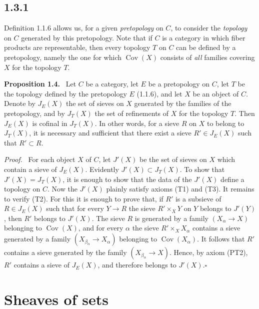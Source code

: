 \documentclass[11pt]{article}
\newcommand{\Cov}{\operatorname{Cov}}
\newcommand{\qedtext}{\hfill\(\square\)}
\newenvironment{statement}[1]{\par\medskip\noindent\textbf{#1.}\ }{\par\medskip}
\newenvironment{prooftext}{\par\noindent\emph{Proof.}\ }{\par\medskip}
\begin{document}
\subsection*{1.3.1}
Definition 1.1.6 allows us, for a given \emph{pretopology} on \(C\), to consider the \emph{topology} on \(C\) generated by this pretopology. Note that if \(C\) is a category in which fiber products are representable, then every topology \(T\) on \(C\) can be defined by a pretopology, namely the one for which \(\Cov(X)\) consists of \emph{all} families covering \(X\) for the topology \(T\).

\begin{statement}{Proposition 1.4}
Let \(C\) be a category, let \(E\) be a pretopology on \(C\), let \(T\) be the topology defined by the pretopology \(E\) (1.1.6), and let \(X\) be an object of \(C\). Denote by \(J_E(X)\) the set of sieves on \(X\) generated by the families of the pretopology, and by \(J_T(X)\) the set of refinements of \(X\) for the topology \(T\). Then \(J_E(X)\) is cofinal in \(J_T(X)\). In other words, for a sieve \(R\) on \(X\) to belong to \(J_T(X)\), it is necessary and sufficient that there exist a sieve \(R'\in J_E(X)\) such that \(R'\subset R\).
\end{statement}

\begin{prooftext}
For each object \(X\) of \(C\), let \(J'(X)\) be the set of sieves on \(X\) which contain a sieve of \(J_E(X)\). Evidently \(J'(X)\subset J_T(X)\). To show that \(J'(X)=J_T(X)\), it is enough to show that the data of the \(J'(X)\) define a topology on \(C\). Now the \(J'(X)\) plainly satisfy axioms (T1) and (T3). It remains to verify (T2). For this it is enough to prove that, if \(R'\) is a subsieve of \(R\in J_E(X)\) such that for every \(Y\to R\) the sieve \(R'\times_XY\) on \(Y\) belongs to \(J'(Y)\), then \(R'\) belongs to \(J'(X)\). The sieve \(R\) is generated by a family \((X_\alpha\to X)\) belonging to \(\Cov(X)\), and for every \(\alpha\) the sieve \(R'\times_XX_\alpha\) contains a sieve generated by a family \((X_{\beta_\alpha}\to X_\alpha)\) belonging to \(\Cov(X_\alpha)\). It follows that \(R'\) contains a sieve generated by the family \((X_{\beta_\alpha}\to X)\). Hence, by axiom (PT2), \(R'\) contains a sieve of \(J_E(X)\), and therefore belongs to \(J'(X)\).\qedtext
\end{prooftext}

\section{Sheaves of sets}
\end{document}
